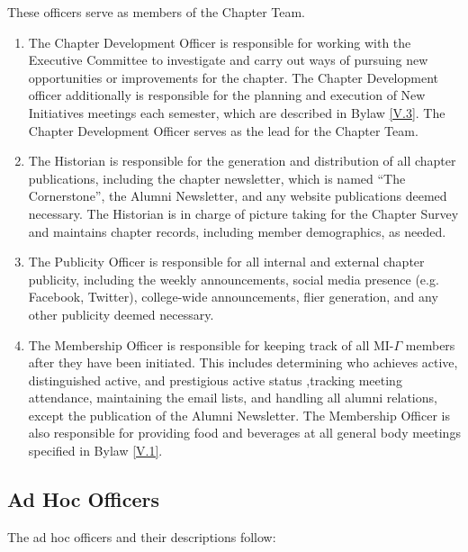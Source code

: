 These officers serve as members of the Chapter Team.
\begin{enumerate}
    \item {}
    The Chapter Development Officer is responsible
for working with the Executive Committee to investigate and carry out ways of pursuing
new opportunities or improvements for the chapter. The Chapter Development
officer additionally is responsible for the planning and execution of New Initiatives
meetings each semester, which are described in Bylaw \ref{V.3}. The Chapter Development
Officer serves as the lead for the Chapter Team.
    \item {}
    The Historian is responsible for the generation and distribution of all
chapter publications, including the chapter newsletter, which is named “The Cornerstone”,
the Alumni Newsletter, and any website publications deemed necessary. The
Historian is in charge of picture taking for the Chapter Survey and maintains chapter
records, including member demographics, as needed.
    \item {}
    The Publicity Officer is responsible for all internal and external
chapter publicity, including the weekly announcements, social media presence
(e.g. Facebook, Twitter), college-wide announcements, flier generation, and any other
publicity deemed necessary.
    \item {}
    The Membership Officer is responsible for keeping track of
all MI-$\Gamma$ members after they have been initiated. This includes determining who
achieves active, distinguished active, and prestigious active status ,tracking meeting
attendance, maintaining the email lists, and handling all alumni relations, except the
publication of the Alumni Newsletter. The Membership Officer is also responsible for
providing food and beverages at all general body meetings specified in Bylaw \ref{V.1}.
\end{enumerate}


\subsection{Ad Hoc Officers} \label{F.4}

The ad hoc officers and their descriptions follow: